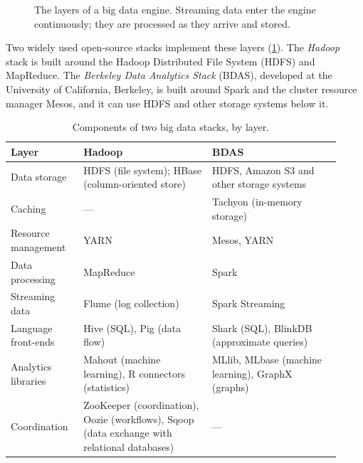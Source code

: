 \documentclass[../main.tex]{subfiles}
\begin{document}
\begin{figure}[htbp]
  \centering
  
  \caption{The layers of a big data engine.  Streaming data enter the
    engine continuously; they are processed as they arrive and stored.}
  \label{fig:l16-bigdata}
\end{figure}

Two widely used open-source stacks implement these layers
(\cref{tab:l16-stacks}).  The \emph{Hadoop} stack is built around the
Hadoop Distributed File System (HDFS) and MapReduce.  The \emph{Berkeley
Data Analytics Stack} (BDAS), developed at the University of California,
Berkeley, is built around Spark and the cluster resource manager Mesos, and
it can use HDFS and other storage systems below it.

\begin{table}[htbp]
  \centering
  \caption{Components of two big data stacks, by layer.}
  \label{tab:l16-stacks}
  \small
  \begin{tabular}{@{}>{\raggedright\arraybackslash}p{0.2\linewidth}>{\raggedright\arraybackslash}p{0.36\linewidth}>{\raggedright\arraybackslash}p{0.36\linewidth}@{}}
    \toprule
    Layer & Hadoop & BDAS \\
    \midrule
    Data storage & HDFS (file system); HBase (column-oriented store) & HDFS,
      Amazon S3 and other storage systems \\
    Caching & --- & Tachyon (in-memory storage) \\
    Resource management & YARN & Mesos, YARN \\
    Data processing & MapReduce & Spark \\
    Streaming data & Flume (log collection) & Spark Streaming \\
    Language front-ends & Hive (SQL), Pig (data flow) & Shark (SQL), BlinkDB
      (approximate queries) \\
    Analytics libraries & Mahout (machine learning), R connectors
      (statistics) & MLlib, MLbase (machine learning), GraphX (graphs) \\
    Coordination & ZooKeeper (coordination), Oozie (workflows), Sqoop (data
      exchange with relational databases) & --- \\
    \bottomrule
  \end{tabular}
\end{table}
\end{document}
